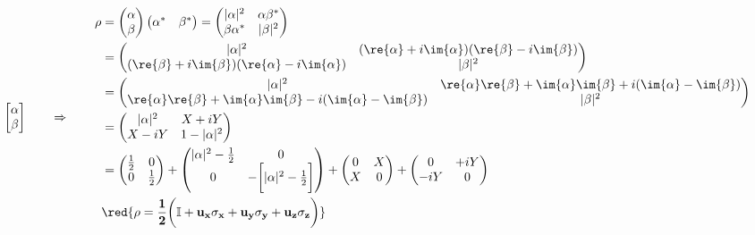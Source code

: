   \begin{equation}
    \begin{bmatrix}
      \alpha\\\beta
    \end{bmatrix}    \qquad\Rightarrow\qquad    \begin{aligned}   \rho    &
      = \begin{pmatrix} \alpha\\\beta
      \end{pmatrix}\begin{pmatrix}
        \alpha^* & \beta^*
      \end{pmatrix}       =      \begin{pmatrix}       |\alpha|^2      &
        \alpha\beta^*\\\beta\alpha^*&|\beta|^2
      \end{pmatrix}\\
      & = \begin{pmatrix}
        |\alpha|^2 & (\re{\alpha}+i\im{\alpha})(\re{\beta}-i\im{\beta})\\ (\re{\beta}+i\im{\beta})(\re{\alpha}-i\im{\alpha}) & |\beta|^2\\
      \end{pmatrix}\\
      & = \begin{pmatrix}
        |\alpha|^2 & \re{\alpha}\re{\beta} +\im{\alpha}\im{\beta} +i(\im{\alpha}-\im{\beta})\\ \re{\alpha}\re{\beta} + \im{\alpha}\im{\beta} -i(\im{\alpha}-\im{\beta}) & |\beta|^2\\
      \end{pmatrix}\\
      & = \begin{pmatrix}
        |\alpha|^2 & X + iY\\ X - iY & 1-|\alpha|^2\\
      \end{pmatrix}\\
      & = \begin{pmatrix} \frac{1}{2} & 0\\0&\frac{1}{2}
      \end{pmatrix}  + \begin{pmatrix}  |\alpha|^2-\frac{1}{2} &  0\\0 &
        -\bigg[|\alpha|^2-\frac{1}{2}\bigg]
      \end{pmatrix}+ \begin{pmatrix} 0 & X\\X&0
      \end{pmatrix} + \begin{pmatrix} 0 & +iY\\-iY&0
      \end{pmatrix}\\
      &      \mathbf{\red{\rho     =      \frac{1}{2}\bigg(\mathbb{I}     +
          u_x\sigma_x+u_y\sigma_y+u_z\sigma_z\bigg)}}
    \end{aligned}
  \end{equation}


  \newpage
